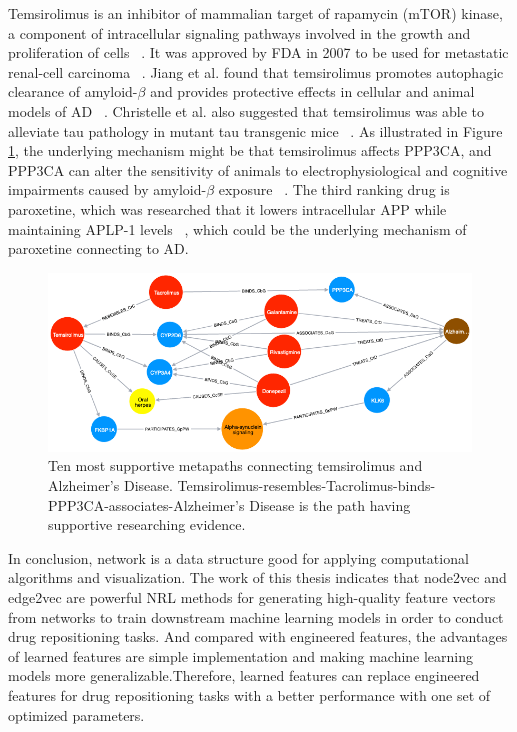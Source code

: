 Temsirolimus is an inhibitor of mammalian target of rapamycin (mTOR) kinase, a component of intracellular signaling pathways involved in the growth and proliferation of cells ~\cite{schmelzle_tor_2000}. It was approved by \ac{FDA} in 2007 to be used for metastatic renal-cell carcinoma ~\cite{hudes_temsirolimus_2007}. Jiang et al. found that temsirolimus promotes autophagic clearance of amyloid-$\beta$ and provides protective effects in cellular and animal models of \ac{AD} ~\cite{jiang_temsirolimus_2014}. Christelle et al. also suggested that temsirolimus was able to alleviate tau pathology in mutant tau transgenic mice ~\cite{frederick_rapamycin_2015}. As illustrated in Figure \ref{fig:temsirolims}, the underlying mechanism might be that temsirolimus affects PPP3CA, and PPP3CA can alter the sensitivity of animals to electrophysiological and cognitive impairments caused by amyloid-$\beta$ exposure ~\cite{nicholls_pp2a_2016}. The third ranking drug is paroxetine, which was researched that it lowers intracellular APP while maintaining APLP-1 levels ~\cite{payton_drug_2003}, which could be the underlying mechanism of paroxetine connecting to \ac{AD}.

\begin{figure}[!h]
    \centering
    \includegraphics[scale=0.5]
    {figures/temsirolims.png}
    \captionsetup{justification=centering}
    \caption{\label{fig:temsirolims}Ten most supportive metapaths connecting temsirolimus and Alzheimer’s Disease. Temsirolimus-resembles-Tacrolimus-binds-PPP3CA-associates-Alzheimer's Disease is the path having supportive researching evidence.
}
\end{figure}

In conclusion, network is a data structure good for applying computational algorithms and visualization. The work of this thesis indicates that node2vec and edge2vec are powerful \ac{NRL} methods for generating high-quality feature vectors from networks to train downstream machine learning models in order to conduct drug repositioning tasks. And compared with engineered features, the advantages of learned features are simple implementation and making machine learning models more generalizable.Therefore, learned features can replace engineered features for drug repositioning tasks with a better performance with one set of optimized parameters. 